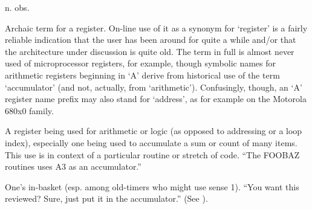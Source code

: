  n. obs.

\begin{inparaenum}
	\item Archaic term for a register. On-line use of it as a synonym for `register' is a fairly reliable indication that the user has been
		around for quite a while and/or that the architecture under discussion is quite old. The term in full is almost never used of
		microprocessor registers, for example, though symbolic names for arithmetic registers beginning in `A' derive from historical use of
		the term `accumulator' (and not, actually, from `arithmetic'). Confusingly, though, an `A' register name prefix may also stand for
		`address', as for example on the Motorola 680x0 family.
	\item A register being used for arithmetic or logic (as opposed to addressing or a loop index), especially one being used to accumulate
		a sum or count of many items. This use is in context of a particular routine or stretch of code. ``The FOOBAZ routines uses A3 as an
		accumulator.''
	\item One's in-basket (esp. among old-timers who might use sense 1). ``You want this reviewed? Sure, just put it in the accumulator.''
		(See ).
\end{inparaenum}

